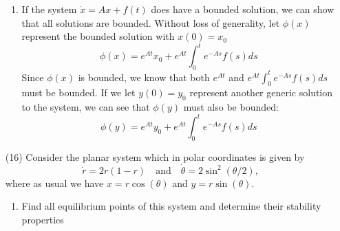 \documentclass[12pt,letterpaper,reqno]{amsart}
\begin{document}
\begin{enumerate}
\begin{enumerate}
    \item If the system $\dot{x} = Ax + f(t)$ does have a bounded solution, we can show that all solutions are bounded. Without loss of generality, let $\phi(x)$ represent the bounded solution with $x(0) = x_0$
    $$\phi(x) = e^{At}x_0 + e^{At}\int_0^t e^{-As}f(s)ds$$
    Since $\phi(x)$ is bounded, we know that both $e^{At}$ and $e^{At}\int_0^t e^{-As}f(s)ds$ must be bounded. If we let $y(0) = y_0$ represent another generic solution to the system, we can see that $\phi(y)$ must also be bounded:
    $$\phi(y) = e^{At}y_0 + e^{At}\int_0^t e^{-As}f(s)ds$$
\end{enumerate}
\newpage
\item[(16)] Consider the planar system which in polar coordinates is given by
$$\dot{r} = 2r(1-r) \quad \text{and} \quad \dot{\theta} = 2\sin^2(\theta/2),$$
where as usual we have $x = r\cos(\theta)$ and $y = r\sin(\theta)$.\newline
\begin{enumerate}
    \item Find all equilibrium points of this system and determine their stability properties \newline
    

\end{enumerate}
\end{enumerate}
\end{document}
